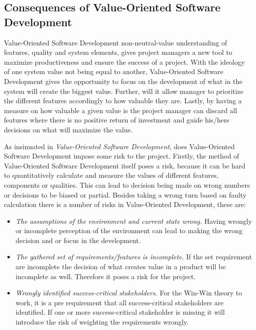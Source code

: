 \documentclass{sig-alternate}
\begin{document}
\subsection{Consequences of Value-Oriented Software Development}
Value-Oriented Software Development non-neutral-value understanding of features, quality and system elements, gives project managers a new tool to maximize productiveness and ensure the success of a project. With the ideology of one system value not being equal to another, Value-Oriented Software Development gives the opportunity to focus on the development of what in the system will create the biggest value. Further, will it allow manager to prioritize the different features accordingly to how valuable they are. Lastly, by having a measure on how valuable a given value is the project manager can discard all features where there is no positive return of investment and guide his/hers decisions on what will maximize the value.  

As insinuated in \textit{Value-Oriented Software Development}, does Value-Oriented Software Development impose some risk to the project. 
Firstly, the method of Value-Oriented Software Development itself poses a risk, because it can be hard to quantitatively calculate and measure the values of different features, components or qualities. This can lead to decision being made on wrong numbers or decisions to be biased or partial. Besides taking a wrong turn based on faulty calculation there is a number of risks in Value-Oriented Development, these are:  
\begin{itemize}
\item \textit{The assumptions of the environment and current state wrong.} Having wrongly or incomplete perception of the environment can lead to making the wrong decision and or focus in the development.  
\item \textit{The gathered set of requirements/features is incomplete.} If the set requirement are incomplete the decision of what creates value in a product will be incomplete as well. Therefore it poses a risk for the project.
\item \textit{Wrongly identified success-critical stakeholders.} For the Win-Win theory to work, it is a pre requirement that all success-critical stakeholders are identified. If one or more success-critical stakeholder is missing it will introduce the risk of weighting the requirements wrongly. 
\end{itemize} 
\end{document}
